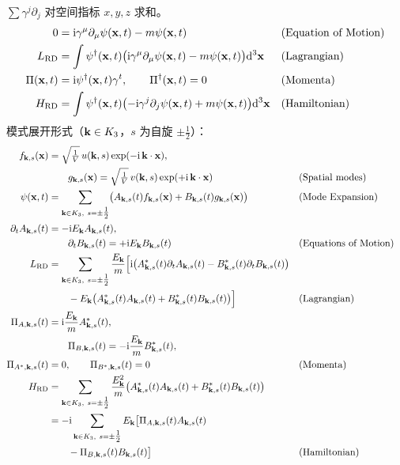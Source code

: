 \begin{keybox}[“经典”黎曼狄拉克方程]
$\sum\gamma^{j}\partial_{j}$ 对空间指标 $x,y,z$ 求和。
\begin{align*}
0&=\mathrm{i}\gamma^{\mu}\partial_{\mu}\psi(\mathbf{x},t)-m\psi(\mathbf{x},t)
&&\text{(Equation of Motion)}\\
L_{\text{RD}}&=\int\psi^{\dagger}(\mathbf{x},t)\bigl(\mathrm{i}\gamma^{\mu}\partial_{\mu}\psi(\mathbf{x},t)-m\psi(\mathbf{x},t)\bigr)\mathrm{d}^{3}\mathbf{x}
&&\text{(Lagrangian)}\\
\Pi(\mathbf{x},t)&=\mathrm{i}\psi^{\dagger}(\mathbf{x},t)\gamma^{t},\qquad
\Pi^{\dagger}(\mathbf{x},t)=0
&&\text{(Momenta)}\\
H_{\text{RD}}&=\int\psi^{\dagger}(\mathbf{x},t)\bigl(-\mathrm{i}\gamma^{j}\partial_{j}\psi(\mathbf{x},t)+m\psi(\mathbf{x},t)\bigr)\mathrm{d}^{3}\mathbf{x}
&&\text{(Hamiltonian)}
\end{align*}
模式展开形式（$\mathbf{k}\in K_{3}$，$s$ 为自旋 $\pm\tfrac12$）：
\begin{align*}
f_{\bk,s}(\bx)&=\sqrt{\tfrac{1}{V}}\,u(\bk,s)\exp(-\ii\,\bk\cdot\bx),\\
&\qquad g_{\bk,s}(\bx)=\sqrt{\tfrac{1}{V}}\,v(\bk,s)\exp(+\ii\,\bk\cdot\bx)
&&\text{(Spatial modes)}\\
\psi(\bx,t)&=\sum_{\bk\in K_{3},\ s=\pm\tfrac12}
\bigl(A_{\bk,s}(t)f_{\bk,s}(\bx)+B_{\bk,s}(t)g_{\bk,s}(\bx)\bigr)
&&\text{(Mode Expansion)}\\
\partial_{t}A_{\bk,s}(t)&=-\ii E_{\bk}A_{\bk,s}(t),\\
&\qquad\partial_{t}B_{\bk,s}(t)=+\ii E_{\bk}B_{\bk,s}(t)
&&\text{(Equations of Motion)}\\
L_{\text{RD}}&=\sum_{\bk\in K_{3},\ s=\pm\tfrac12}\frac{E_{\bk}}{m}
\Bigl[\ii\bigl(A^{*}_{\bk,s}(t)\partial_{t}A_{\bk,s}(t)-B^{*}_{\bk,s}(t)\partial_{t}B_{\bk,s}(t)\bigr)\\
&\qquad -E_{\bk}\bigl(A^{*}_{\bk,s}(t)A_{\bk,s}(t)+B^{*}_{\bk,s}(t)B_{\bk,s}(t)\bigr)\Bigr]
&&\text{(Lagrangian)}\\
\Pi_{A,\bk,s}(t)&=\ii\frac{E_{\bk}}{m}A^{*}_{\bk,s}(t),\\
&\qquad\Pi_{B,\bk,s}(t)=-\ii\frac{E_{\bk}}{m}B^{*}_{\bk,s}(t),\\
\Pi_{A^{*},\bk,s}(t)&=0,\qquad
\Pi_{B^{*},\bk,s}(t)=0
&&\text{(Momenta)}\\
H_{\text{RD}}&=\sum_{\bk\in K_{3},\ s=\pm\tfrac12}\frac{E_{\bk}^{2}}{m}
\bigl(A^{*}_{\bk,s}(t)A_{\bk,s}(t)+B^{*}_{\bk,s}(t)B_{\bk,s}(t)\bigr)\\
&=-\ii\sum_{\bk\in K_{3},\ s=\pm\tfrac12}E_{\bk}
\bigl[\Pi_{A,\bk,s}(t)A_{\bk,s}(t)\\
&\qquad-\Pi_{B,\bk,s}(t)B_{\bk,s}(t)\bigr]
&&\text{(Hamiltonian)}
\end{align*}
\end{keybox}

